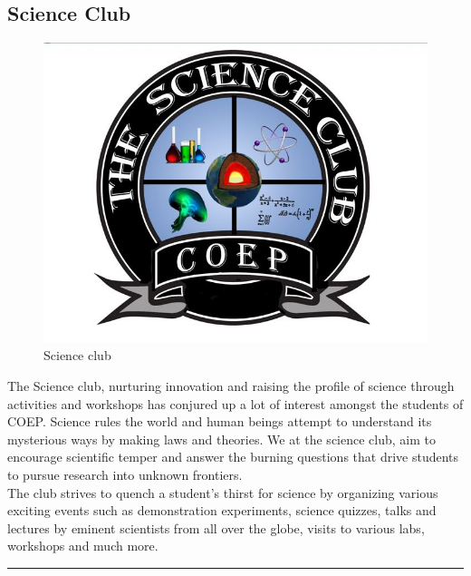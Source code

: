 \documentclass[12pt]{article}
\begin{document}
\subsection{Science Club}
\begin{figure}[h]
    \centering
    \includegraphics[scale=0.4]{science club}
    \caption{Science club}
    \label{fig4:scienceclub}
\end{figure}
The Science club, nurturing innovation and raising the profile of science through activities and workshops has conjured up a lot of interest amongst the students of COEP. Science rules the world and human beings attempt to understand its mysterious ways by making laws and theories. We at the science club, aim to encourage scientific temper and answer the burning questions that drive students to pursue research into unknown frontiers.\\
The club strives to quench a student’s thirst for science by organizing various exciting events such as demonstration experiments, science quizzes, talks and lectures by eminent scientists from all over the globe, visits to various labs, workshops and much more.\\
\hrule
\end{document}
